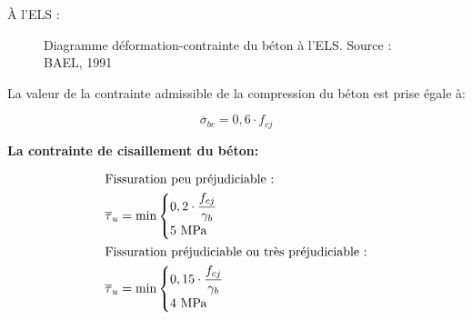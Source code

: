\documentclass[12pt,a4paper]{report}
\numberwithin{equation}{section}
\newcommand{\sgma}[1]{\sigma_{#1}}
\newcommand{\sigmabar}[1]{\overline{\sigma}_{#1}}
\newcommand{\taubar}[1]{\overline{\tau}_{#1}}
\begin{document}
	
	\vspace{3\baselineskip}
	
	À l'ELS :
	
	
	\begin{figure}[H]
		\centering
		\caption{Diagramme déformation-contrainte du béton à l'ELS. Source : BAEL, 1991 \protect\footnotemark[2]}
		\label{fig:diagramme-ELS-beton}
	\end{figure}
	
	
	La valeur de la contrainte admissible de la compression du béton est prise égale à\footnotemark[2] :
	
	\begin{equation}
		\sigmabar{bc} = 0,6 \cdot f_{cj}
		\label{eq:sigmabar-bc}
	\end{equation}
	
	\textbf{La contrainte de cisaillement du béton\footnotemark[2] :}
	
	
	
	
	\begin{equation}
		\begin{aligned}
			&\text{Fissuration peu préjudiciable :}\\
			&\taubar{u} = \min \begin{cases}
				0,2 \cdot \dfrac{f_{cj}}{\gamma_{b}} \\
				5\mpa
			\end{cases}
			\\
			&\text{Fissuration préjudiciable ou très préjudiciable :} \\
			&\taubar{u} = \min \begin{cases}
				0,15 \cdot \dfrac{f_{cj}}{\gamma_{b}} \\
				4\mpa
			\end{cases}
		\end{aligned}
		\label{eq:cisaillement-beton}
	\end{equation}
	
\end{document}
